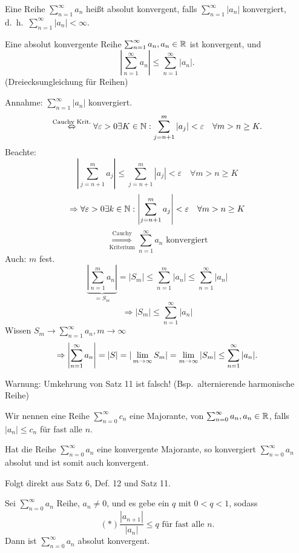 \documentclass[../ana1.tex]{subfiles}
\begin{document}
\begin{defi}
	Eine Reihe \( \sum_{n=1}^{\infty} a_n \) heißt absolut konvergent, falls \( \sum_{n=1}^{\infty}|a_n| \) konvergiert, d.\ h.\  \(\sum_{n=1}^{\infty}|a_n|<\infty \).
\end{defi}
\begin{satz}
	Eine absolut konvergente Reihe \( \sum_{n=1}^{\infty}a_n, a_n \in\mathbb{R} \) ist konvergent, und
	\[ \left| \sum_{n=1}^{\infty}a_n \right| \leq \sum_{n=1}^{\infty}|a_n|.\] (Dreiecksungleichung für Reihen)
\end{satz}
\begin{bew}
	Annahme: \( \sum_{n=1}^{\infty} |a_n| \) konvergiert.
	\[ \overset{\text{Cauchy Krit.}}{\Leftrightarrow} \forall \varepsilon>0 \exists K\in\mathbb{N}: \sum_{j=n+1}^{m} |a_j| < \varepsilon\quad\forall m>n\geq K. \]
	Beachte: 
	\[ \left| \sum_{j=n+1}^{m}a_j \right| \leq \sum_{j=n+1}^{m}|a_j| < \varepsilon \quad \forall m>n\geq K \]
	\[\Rightarrow \forall \varepsilon > 0 \exists k \in \mathbb{N}: \left| \sum_{j = n+1}^{m} a_j \right| < \varepsilon \quad \forall m>n\geq K\]
	\[\overset{\text{Cauchy}}{\underset{\text{Kriterium}}{\Rightarrow}} \sum_{n=1}^{\infty} a_n \text{ konvergiert}\]
	Auch: \(m\) fest.
	\[ \underbrace{\left| \sum_{n=1}^{m}a_n \right|}_{=S_m}  = |S_m| \leq \sum_{n=1}^{m}|a_n| \leq \sum_{n=1}^{\infty}|a_n| \]
	\[ \Rightarrow |S_m| \leq \sum_{n=1}^{\infty}|a_n| \]
	Wissen \( S_m\rightarrow \sum_{n=1}^{\infty}a_n, m\rightarrow\infty \)
	\[ \Rightarrow \left|\sum_{n=1}^{\infty}a_n \right| = |S| = |\lim\limits_{m\rightarrow\infty}S_m| = \lim\limits_{m\rightarrow\infty}|S_m| \leq \sum_{n=1}^{\infty}|a_n|. \]
\end{bew}
\begin{bem}
	Warnung: Umkehrung von Satz 11 ist falsch! (Bsp.\ alternierende harmonische Reihe)
\end{bem}
\begin{defi}
	Wir nennen eine Reihe \( \sum_{n=0}^{\infty}c_n \) eine Majorante, von \( \sum_{n=0}^{\infty}a_n, a_n\in\mathbb{R} \), falls \( |a_n| \leq c_n \) für fast alle \(n\).
\end{defi}
\begin{kor}
	Hat die Reihe \( \sum_{n=0}^{\infty}a_n \) eine konvergente Majorante, so konvergiert \( \sum_{n=0}^{\infty}a_n \) absolut und ist somit auch konvergent.
\end{kor}
\begin{bew}
	Folgt direkt aus Satz 6, Def. 12 und Satz 11.
\end{bew}
\begin{satz}[Quotientenkriterium]
	Sei \( \sum_{n=0}^{\infty}a_n \) Reihe, \(a_n\neq0\), und es gebe ein \(q\) mit \(0<q<1\), sodass
	\[(*) \frac{|a_{n+1}|}{|a_n|} \leq q \text{ für fast alle }n. \]
	Dann ist \( \sum_{n=0}^{\infty}a_n \) absolut konvergent.
\end{satz}
\end{document}

